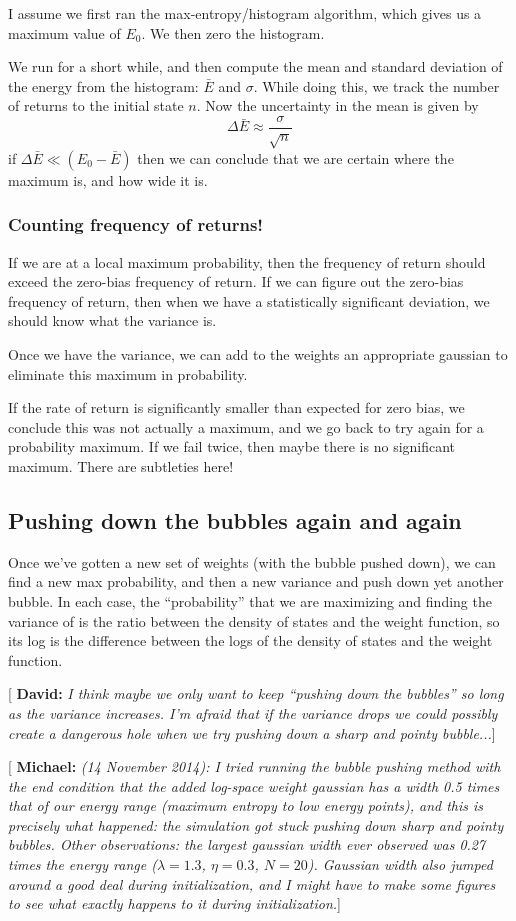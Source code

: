 \documentclass[letterpaper,twocolumn,amsmath,amssymb,pre,aps,10pt]{revtex4-1}
\newcommand{\green}[1]{{\bf \color{green} #1}}
\newcommand{\blue}[1]{{\bf \color{blue} #1}}
\newcommand{\davidsays}[1]{{\color{red} [\green{David:} \emph{#1}]}}
\newcommand{\mpsays}[1]{{\color{red} [\blue{Michael:} \emph{#1}]}}
\begin{document}
I assume we first ran the max-entropy/histogram algorithm, which gives
us a maximum value of $E_0$.  We then zero the histogram.

We run for a short while, and then compute the mean and standard
deviation of the energy from the histogram: $\bar E$ and $\sigma$.
While doing this, we track the number of returns to the initial state
$n$.  Now the uncertainty in the mean is given by
\begin{equation}
  \Delta \bar E \approx \frac{\sigma}{\sqrt{n}}
\end{equation}
if $\Delta \bar E \ll (E_0 - \bar E)$ then we can conclude that we are
certain where the maximum is, and how wide it is.

\subsubsection{Counting frequency of returns!}
If we are at a local maximum probability, then the frequency of return
should exceed the zero-bias frequency of return.  If we can figure out
the zero-bias frequency of return, then when we have a statistically
significant deviation, we should know what the variance is.

Once we have the variance, we can add to the weights an appropriate
gaussian to eliminate this maximum in probability.

If the rate of return is significantly smaller than expected for zero
bias, we conclude this was not actually a maximum, and we go back to
try again for a probability maximum.  If we fail twice, then maybe
there is no significant maximum.  There are subtleties here!

\subsection{Pushing down the bubbles again and again}
Once we've gotten a new set of weights (with the bubble pushed down),
we can find a new max probability, and then a new variance and push
down yet another bubble.  In each case, the ``probability'' that we
are maximizing and finding the variance of is the ratio between the
density of states and the weight function, so its log is the
difference between the logs of the density of states and the weight
function.

\davidsays{I think maybe we only want to keep ``pushing down the
  bubbles'' so long as the variance increases.  I'm afraid that if the
  variance drops we could possibly create a dangerous hole when we try
  pushing down a sharp and pointy bubble...}

\mpsays{(14 November 2014): I tried running the bubble pushing method
  with the end condition that the added log-space weight gaussian has
  a width 0.5 times that of our energy range (maximum entropy to low
  energy points), and this is precisely what happened: the simulation
  got stuck pushing down sharp and pointy bubbles. Other observations:
  the largest gaussian width ever observed was 0.27 times the energy
  range ($\lambda=1.3$, $\eta=0.3$, $N=20$). Gaussian width also
  jumped around a good deal during initialization, and I might have to
  make some figures to see what exactly happens to it during
  initialization.}
\end{document}

